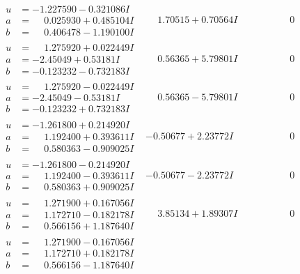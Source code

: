 \documentclass[1p]{elsarticle_modified}
\theoremstyle{definition}
\begin{document}
$$\begin{array}{c|c|c}
\begin{aligned}
u &= -1.227590 - 0.321086 I \\
a &= \phantom{-}0.025930 + 0.485104 I \\
b &= \phantom{-}0.406478 - 1.190100 I\end{aligned}
 & \phantom{-}1.70515 + 0.70564 I & \phantom{-0.000000 } 0 \\ \hline\begin{aligned}
u &= \phantom{-}1.275920 + 0.022449 I \\
a &= -2.45049 + 0.53181 I \\
b &= -0.123232 - 0.732183 I\end{aligned}
 & \phantom{-}0.56365 + 5.79801 I & \phantom{-0.000000 } 0 \\ \hline\begin{aligned}
u &= \phantom{-}1.275920 - 0.022449 I \\
a &= -2.45049 - 0.53181 I \\
b &= -0.123232 + 0.732183 I\end{aligned}
 & \phantom{-}0.56365 - 5.79801 I & \phantom{-0.000000 } 0 \\ \hline\begin{aligned}
u &= -1.261800 + 0.214920 I \\
a &= \phantom{-}1.192400 + 0.393611 I \\
b &= \phantom{-}0.580363 - 0.909025 I\end{aligned}
 & -0.50677 + 2.23772 I & \phantom{-0.000000 } 0 \\ \hline\begin{aligned}
u &= -1.261800 - 0.214920 I \\
a &= \phantom{-}1.192400 - 0.393611 I \\
b &= \phantom{-}0.580363 + 0.909025 I\end{aligned}
 & -0.50677 - 2.23772 I & \phantom{-0.000000 } 0 \\ \hline\begin{aligned}
u &= \phantom{-}1.271900 + 0.167056 I \\
a &= \phantom{-}1.172710 - 0.182178 I \\
b &= \phantom{-}0.566156 + 1.187640 I\end{aligned}
 & \phantom{-}3.85134 + 1.89307 I & \phantom{-0.000000 } 0 \\ \hline\begin{aligned}
u &= \phantom{-}1.271900 - 0.167056 I \\
a &= \phantom{-}1.172710 + 0.182178 I \\
b &= \phantom{-}0.566156 - 1.187640 I\end{aligned}

\end{array}$$
\end{document}
